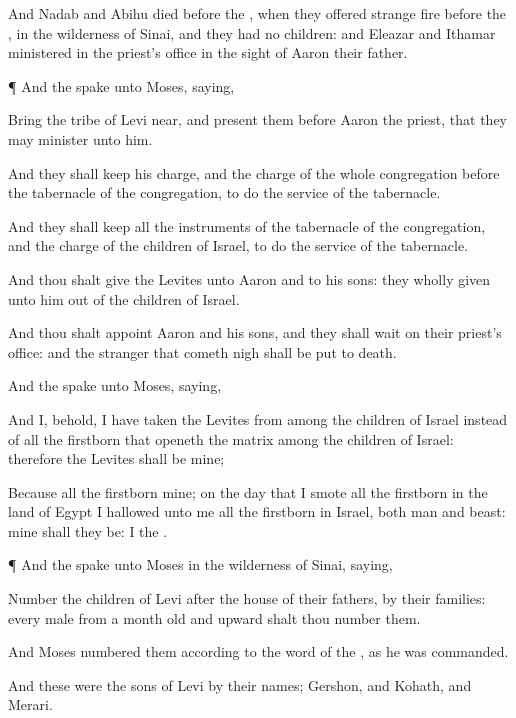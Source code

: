 {And
Nadab and
Abihu
died
before the
{}, when they
offered
strange
fire
before the
{}, in the
wilderness of
Sinai, and they had no
children: and
Eleazar and
Ithamar ministered in the
priest’s office in the
sight of
Aaron their
father.


\par }{\PP {}¶ And the
{}
spake unto
Moses,
saying,

Bring the
tribe of
Levi
near, and
present them
before
Aaron the
priest, that they may
minister unto him.

And they shall
keep his
charge, and the
charge of the whole
congregation
before the
tabernacle of the
congregation, to
do the
service of the
tabernacle.

And they shall
keep all the
instruments of the
tabernacle of the
congregation, and the
charge of the
children of
Israel, to
do the
service of the
tabernacle.

And thou shalt
give the
Levites unto
Aaron and to his
sons: they
{} wholly
given unto him out of the
children of
Israel.

And thou shalt
appoint
Aaron and his
sons, and they shall wait
on their
priest’s office: and the
stranger that cometh
nigh shall be put to
death.

And the
{}
spake unto
Moses,
saying,

And I, behold, I have
taken the
Levites from
among the
children of
Israel instead of all the
firstborn that
openeth the
matrix among the
children of
Israel: therefore the
Levites shall be mine;

Because all the
firstborn
{} mine;
{} on the
day that I
smote all the
firstborn in the
land of
Egypt I
hallowed unto me all the
firstborn in
Israel, both
man and
beast: mine shall they be: I
{} the
{}.


\par }{\PP {}¶ And the
{}
spake unto
Moses in the
wilderness of
Sinai,
saying,

Number the
children of
Levi after the
house of their
fathers, by their
families: every
male from a
month
old and
upward shalt thou
number them.

And
Moses
numbered them according to the
word of the
{}, as he was
commanded.

And these were the
sons of
Levi by their
names;
Gershon, and
Kohath, and
Merari.

}

